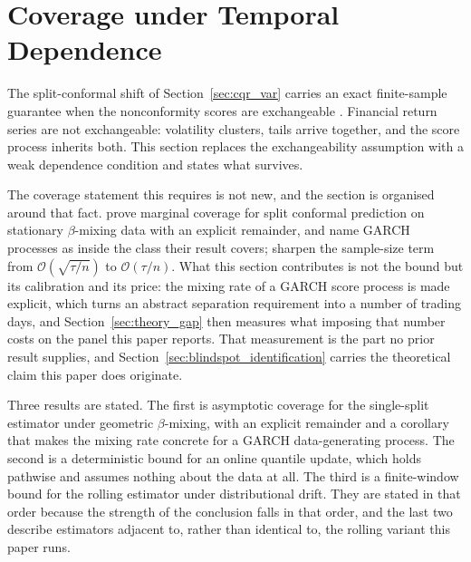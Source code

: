 \section{Coverage under Temporal Dependence}
\label{sec:theory}

The split-conformal shift of Section~\ref{sec:cqr_var} carries an exact
finite-sample guarantee when the nonconformity scores are exchangeable
\citep{vovk2005algorithmic,lei2018distribution}. Financial return series are not
exchangeable: volatility clusters, tails arrive together, and the score process
inherits both. This section replaces the exchangeability assumption with a weak
dependence condition and states what survives.

The coverage statement this requires is not new, and the section is organised
around that fact. \citet{oliveira2024split} prove marginal coverage for split
conformal prediction on stationary $\beta$-mixing data with an explicit
remainder, and name GARCH processes as inside the class their result covers;
\citet{barber2026predictive} sharpen the sample-size term from
$\mathcal O(\sqrt{\tau/n})$ to $\mathcal O(\tau/n)$. What this section
contributes is not the bound but its calibration and its price: the mixing rate
of a GARCH score process is made explicit, which turns an abstract separation
requirement into a number of trading days, and
Section~\ref{sec:theory_gap} then measures what imposing that number costs on
the panel this paper reports. That measurement is the part no prior result
supplies, and Section~\ref{sec:blindspot_identification} carries the theoretical claim
this paper does originate.

Three results are stated. The first is asymptotic coverage for the single-split
estimator under geometric $\beta$-mixing, with an explicit remainder and a
corollary that makes the mixing rate concrete for a GARCH data-generating
process. The second is a deterministic bound for an online quantile update, which
holds pathwise and assumes nothing about the data at all. The third is a
finite-window bound for the rolling estimator under distributional drift. They
are stated in that order because the strength of the conclusion falls in that
order, and the last two describe estimators adjacent to, rather than identical
to, the rolling variant this paper runs.

